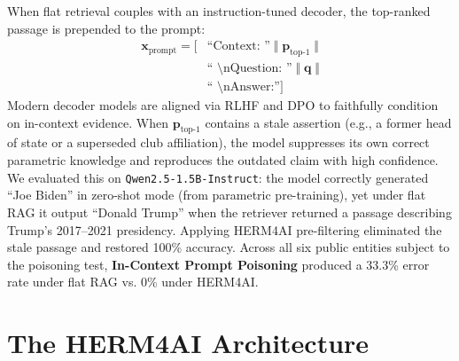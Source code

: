 \documentclass[11pt,a4paper,twocolumn]{article}
\newcommand{\herm}{\textsc{HERM4AI}}
\newcommand{\icpp}{\textbf{In-Context Prompt Poisoning}}
\begin{document}
When flat retrieval couples with an instruction-tuned decoder, the
top-ranked passage is prepended to the prompt:
\begin{equation}
\begin{aligned}
\mathbf{x}_{\text{prompt}} = [&\text{``Context: ''} \;\Vert\;
\mathbf{p}_{\text{top-1}} \;\Vert\\
&\text{`` \textbackslash{}nQuestion: ''} \;\Vert\;
\mathbf{q} \;\Vert\\
&\text{`` \textbackslash{}nAnswer:''}]
\end{aligned}
\label{eq:prompt}
\end{equation}
Modern decoder models are aligned via RLHF and DPO to faithfully
condition on in-context evidence.  When $\mathbf{p}_{\text{top-1}}$
contains a stale assertion (e.g., a former head of state or a
superseded club affiliation), the model suppresses its own correct
parametric knowledge and reproduces the outdated claim with high
confidence.  We evaluated this on \texttt{Qwen2.5-1.5B-Instruct}:
the model correctly generated ``Joe Biden'' in zero-shot mode (from
parametric pre-training), yet under flat RAG it output ``Donald Trump''
when the retriever returned a passage describing Trump's 2017--2021
presidency.  Applying \herm{} pre-filtering eliminated the stale
passage and restored 100\% accuracy.  Across all six public
entities subject to the poisoning test, \icpp{} produced a 33.3\%
error rate under flat RAG vs. 0\% under \herm{}.

\section{The \herm{} Architecture}
\label{sec:arch}
\end{document}
